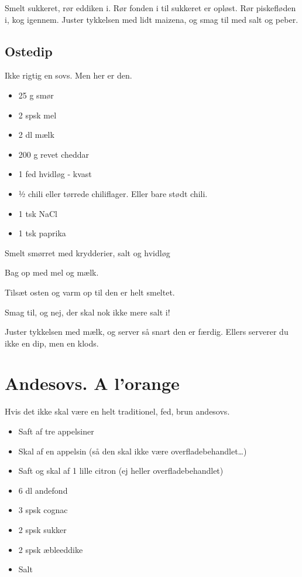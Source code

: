 \documentclass[
]{book}
\providecommand{\tightlist}{%
  \setlength{\itemsep}{0pt}\setlength{\parskip}{0pt}}
\begin{document}
Smelt sukkeret, rør eddiken i. Rør fonden i til sukkeret er opløst. Rør piskefløden i, kog igennem. Juster tykkelsen med lidt maizena, og smag til med salt og peber.

\subsection{Ostedip}\label{ostedip}

Ikke rigtig en sovs. Men her er den.

\begin{itemize}
\tightlist
\item
  25 g smør
\item
  2 spsk mel
\item
  2 dl mælk
\item
  200 g revet cheddar
\item
  1 fed hvidløg - kvast
\item
  ½ chili eller tørrede chiliflager. Eller bare stødt chili.
\item
  1 tsk NaCl
\item
  1 tsk paprika
\end{itemize}

Smelt smørret med krydderier, salt og hvidløg

Bag op med mel og mælk.

Tilsæt osten og varm op til den er helt smeltet.

Smag til, og nej, der skal nok ikke mere salt i!

Juster tykkelsen med mælk, og server så snart den er færdig. Ellers serverer du ikke en dip, men en klods.

\section{Andesovs. A l'orange}\label{andesovs.-a-lorange}

Hvis det ikke skal være en helt traditionel, fed, brun andesovs.

\begin{itemize}
\tightlist
\item
  Saft af tre appelsiner
\item
  Skal af en appelsin (så den skal ikke være overfladebehandlet\ldots)
\item
  Saft og skal af 1 lille citron (ej heller overfladebehandlet)
\item
  6 dl andefond
\item
  3 spsk cognac
\item
  2 spsk sukker
\item
  2 spsk æbleeddike
\item
  Salt
\end{itemize}
\end{document}
